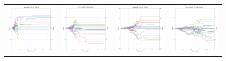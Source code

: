 \begin{figure}
\begin{tabular}{cccc}
\hspace{-0.5cm}\includegraphics[width = 1.55in]{images/Visualizations/GAvsMCTS/1000ms5x5.png} &
\hspace{-0.5cm}\includegraphics[width = 1.55in]{images/Visualizations/GAvsMCTS/1000ms7x7.png} &
\hspace{-0.5cm}\includegraphics[width = 1.55in]{images/Visualizations/GAvsMCTS/1000ms9x9.png} &
\hspace{-0.5cm}\includegraphics[width = 1.55in]{images/Visualizations/GAvsMCTS/1000ms11x11.png} \\


\end{tabular}
\end{figure}
